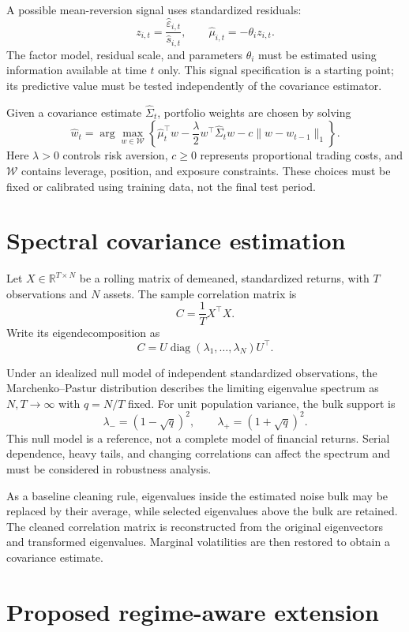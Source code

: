 \documentclass[11pt]{article}
\begin{document}
A possible mean-reversion signal uses standardized residuals:
\[
    z_{i,t} = \frac{\widehat{\varepsilon}_{i,t}}{\widehat{s}_{i,t}},
    \qquad
    \widehat{\mu}_{i,t} = -\theta_i z_{i,t}.
\]
The factor model, residual scale, and parameters $\theta_i$ must be estimated
using information available at time $t$ only. This signal specification is a
starting point; its predictive value must be tested independently of the
covariance estimator.

Given a covariance estimate $\widehat{\Sigma}_t$, portfolio weights are chosen
by solving
\[
\widehat{w}_t =
\arg\max_{w \in \mathcal{W}}
\left\{
    \widehat{\mu}_t^\top w
    - \frac{\lambda}{2} w^\top \widehat{\Sigma}_t w
    - c \lVert w-w_{t-1}\rVert_1
\right\}.
\]
Here $\lambda > 0$ controls risk aversion, $c \geq 0$ represents proportional
trading costs, and $\mathcal{W}$ contains leverage, position, and exposure
constraints. These choices must be fixed or calibrated using training data, not
the final test period.

\section{Spectral covariance estimation}

Let $X \in \mathbb{R}^{T \times N}$ be a rolling matrix of demeaned,
standardized returns, with $T$ observations and $N$ assets. The sample
correlation matrix is
\[
    C = \frac{1}{T}X^\top X.
\]
Write its eigendecomposition as
\[
    C = U \operatorname{diag}(\lambda_1,\ldots,\lambda_N) U^\top.
\]

Under an idealized null model of independent standardized observations, the
Marchenko--Pastur distribution describes the limiting eigenvalue spectrum as
$N,T \to \infty$ with $q=N/T$ fixed. For unit population variance, the bulk
support is
\[
    \lambda_- = (1-\sqrt{q})^2,
    \qquad
    \lambda_+ = (1+\sqrt{q})^2.
\]
This null model is a reference, not a complete model of financial returns.
Serial dependence, heavy tails, and changing correlations can affect the
spectrum and must be considered in robustness analysis.

As a baseline cleaning rule, eigenvalues inside the estimated noise bulk may be
replaced by their average, while selected eigenvalues above the bulk are retained.
The cleaned correlation matrix is reconstructed from the original eigenvectors
and transformed eigenvalues. Marginal volatilities are then restored to obtain a
covariance estimate.

\section{Proposed regime-aware extension}
\end{document}
